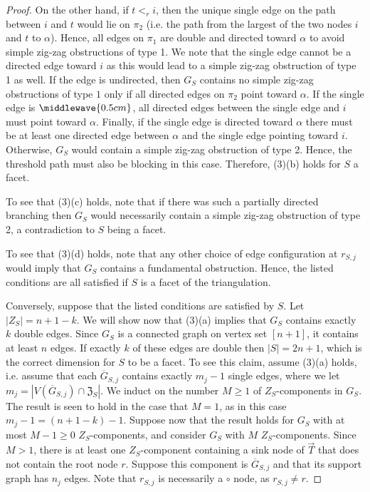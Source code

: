 \begin{proof}
On the other hand, if $t <_r i$, then the unique single edge on the path between $i$ and $t$ would lie on $\pi_2$ (i.e. the path from the largest of the two nodes $i$ and $t$ to $\alpha$).  
Hence, all edges on $\pi_1$ are double and directed toward $\alpha$ to avoid simple zig-zag obstructions of type 1.
We note that the single edge cannot be a directed edge toward $i$ as this would lead to a simple zig-zag obstruction of type 1 as well. 
If the edge is undirected, then $G_S$ contains no simple zig-zag obstructions of type $1$ only if all directed edges on $\pi_2$ point toward $\alpha$. 
If the single edge is $\middlewave{0.5cm}$, all directed edges between the single edge and $i$ must point toward $\alpha$.  
Finally, if the single edge is directed toward $\alpha$ there must be at least one directed edge between $\alpha$ and the single edge pointing toward $i$. 
Otherwise, $G_S$ would contain a simple zig-zag obstruction of type 2. 
Hence, the threshold path must also be blocking in this case. 
Therefore, (3)(b) holds for $S$ a facet. 

To see that (3)(c) holds, note that if there was such a partially directed branching then $G_S$ would necessarily contain a simple zig-zag obstruction of type 2, a contradiction to $S$ being a facet. 

To see that (3)(d) holds, note that any other choice of edge configuration at $r_{S,j}$ would imply that $G_S$ contains a fundamental obstruction. 
Hence, the listed conditions are all satisfied if $S$ is a facet of the triangulation. 

Conversely, suppose that the listed conditions are satisfied by $S$. 
Let $|Z_S| = n+1-k$.  
We will show now that (3)(a) implies that $G_S$ contains exactly $k$ double edges.  
Since $G_S$ is a connected graph on vertex set $[n+1]$, it contains at least $n$ edges.   
If exactly $k$ of these edges are double then $|S| = 2n+1$, which is the correct dimension for $S$ to be a facet. 
To see this claim, assume (3)(a) holds, i.e. assume that each $\overline{G}_{S,j}$ contains exactly $m_j-1$ single edges, where we let $m_j = |V(\overline{G}_{S,j})\cap\mathfrak{Z}_S|$. 
We induct on the number $M\geq1$ of $Z_S$-components in $G_S$.  
The result is seen to hold in the case that $M = 1$, as in this case $m_j - 1 = (n+1 - k) - 1$. 
Suppose now that the result holds for $G_S$ with at most $M-1 \geq 0$ $Z_S$-components, and consider $G_S$ with $M$ $Z_S$-components. 
Since $M > 1$, there is at least one $Z_S$-component containing a sink node of $\overrightarrow{T}$ that does not contain the root node $r$.  
Suppose this component is $\overline{G}_{S,j}$ and that its support graph has $n_j$ edges. 
Note that $r_{S,j}$ is necessarily a $\circ$ node, as $r_{S,j} \neq r$. 


\end{proof}
